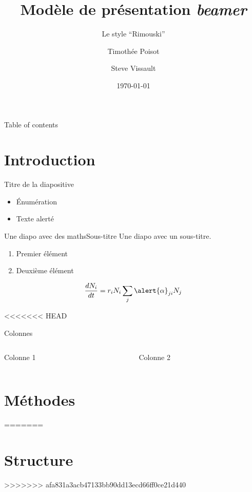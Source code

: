 \documentclass{eecslides}
\title[Modèle \emph{beamer}]{Modèle de présentation \emph{beamer}}
\subtitle{Le style ``Rimouski''}
\author[Tim \& Steve]{Timothée Poisot \and Steve Vissault}
\institute[Chaire de recherche EEC]{UQAR -- Chaire de Recherche EEC}
\date{\today}
\begin{document}
	\begin{frame}[plain]
		\titlepage
	\end{frame}

	\begin{frame}[plain]{Table of contents}
		\tableofcontents
	\end{frame}

	\section{Introduction}

	\begin{frame}{Titre de la diapositive}
	    
		\begin{itemize}
			\item Énumération
			\item Texte \alert{alerté} 
		\end{itemize}
	
	\end{frame}

	\begin{frame}{Une diapo avec des maths}{Sous-titre}
		Une diapo avec un sous-titre.

		\begin{enumerate}
			\item Premier élément
			\item Deuxième élément
		\end{enumerate}

		$$\frac{dN_i}{dt} = r_iN_i\sum_j\alert{\alpha}_{ji}N_j$$

	\end{frame}

<<<<<<< HEAD
	\begin{frame}{Colonnes}
		
		\begin{columns}
			\begin{column}[t]{0.5\textwidth}
				Colonne 1
			\end{column}
			\begin{column}[t]{0.5\textwidth}
				Colonne 2
			\end{column}
		\end{columns}

	\end{frame}

	\section{Méthodes}
=======
	\section{Structure}
>>>>>>> afa831a3acb47133bb90dd13ecd66ff0ce21d440
\end{document}

